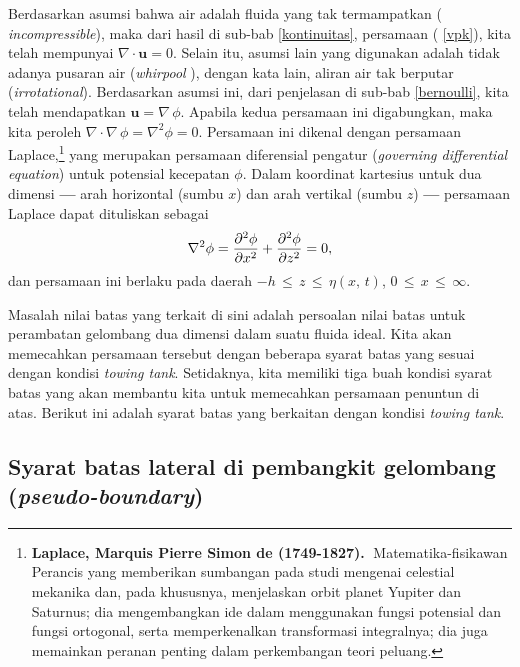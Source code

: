 \documentclass[12pt,a4paper]{report}
\begin{document}
Berdasarkan asumsi bahwa air adalah fluida yang tak termampatkan (\textit{%
incompressible}), maka dari hasil di sub-bab \ref{kontinuitas}, persamaan (%
\ref{vpk}), kita telah mempunyai $\nabla\cdot\mathbf{u}=0$. Selain itu,
asumsi lain yang digunakan adalah tidak adanya pusaran air (\textit{whirpool}%
), dengan kata lain, aliran air tak berputar
(\textit{irrotational}). Berdasarkan asumsi ini, dari penjelasan
di sub-bab \ref{bernoulli}, kita telah mendapatkan
$\mathbf{u}=\nabla\,\phi$. Apabila kedua persamaan ini
digabungkan, maka kita peroleh
$\nabla\cdot\nabla\,\phi=\nabla^{2}\phi=0$. Persamaan ini dikenal
dengan persamaan Laplace,\footnote[1]{\textbf{Laplace, Marquis
Pierre Simon de (1749-1827).}$\;$ Matematika-fisikawan Perancis
yang memberikan sumbangan pada studi mengenai celestial mekanika
dan, pada khususnya, menjelaskan orbit planet Yupiter dan
Saturnus; dia mengembangkan ide dalam menggunakan fungsi potensial
dan fungsi ortogonal, serta memperkenalkan transformasi
integralnya; dia juga memainkan peranan penting dalam perkembangan
teori peluang.} yang merupakan persamaan diferensial pengatur
(\textit{governing differential equation}) untuk potensial
kecepatan $\phi$. Dalam koordinat kartesius untuk dua dimensi
\textbf{---} arah horizontal (sumbu $x$) dan arah vertikal (sumbu
$z$) \textbf{---} persamaan Laplace dapat dituliskan sebagai
\begin{eqnarray}
\nabla^2\phi = \frac{\partial^2\phi}{\partial x^2}+\frac{\partial^2\phi}{%
\partial z^2}=0,
\end{eqnarray}
dan persamaan ini berlaku pada daerah $-h \,\leq\, z \, \leq\, \eta(x,\,t)$,
\quad $0 \,\leq\, x\, \leq \,\infty$.

Masalah nilai batas yang terkait di sini adalah persoalan nilai batas untuk
perambatan gelombang dua dimensi dalam suatu fluida ideal. Kita akan
memecahkan persamaan tersebut dengan beberapa syarat batas yang sesuai
dengan kondisi \textit{towing tank}. Setidaknya, kita memiliki tiga buah
kondisi syarat batas yang akan membantu kita untuk memecahkan persamaan
penuntun di atas. Berikut ini adalah syarat batas yang berkaitan dengan
kondisi \textit{towing tank}.

\subsection{Syarat batas lateral di pembangkit gelombang\\ (\textit{pseudo-boundary})}
\end{document}
